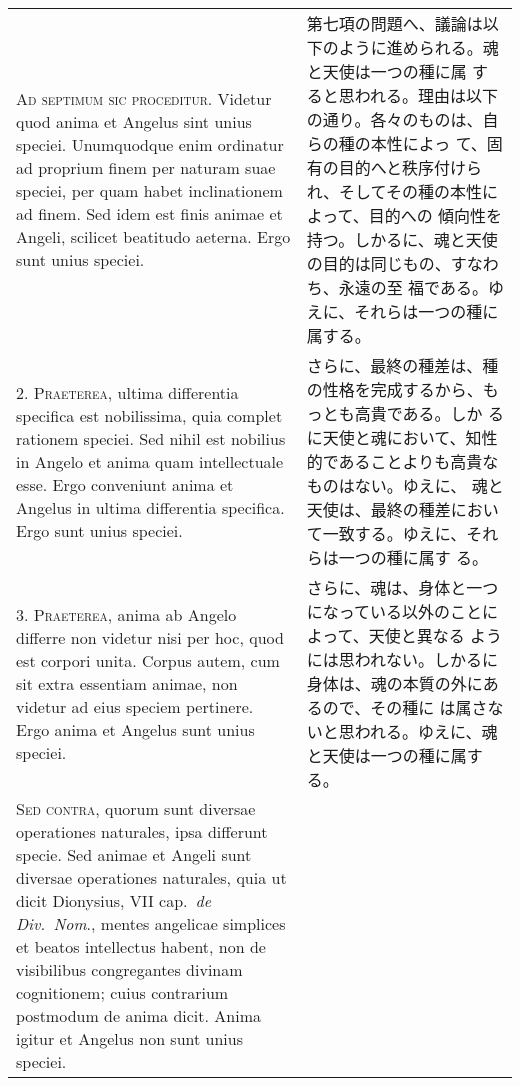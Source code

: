 \documentclass[paper=a4paper,fontsize=10pt,jafontsize=9pt,titlepage]{jlreq}
\begin{document}
\begin{longtable}{p{21em}p{21em}}

{\scshape Ad septimum sic proceditur}. Videtur quod anima et Angelus
 sint unius speciei. Unumquodque enim ordinatur ad proprium finem per
 naturam suae speciei, per quam habet inclinationem ad finem. Sed idem
 est finis animae et Angeli, scilicet beatitudo aeterna. Ergo sunt
 unius speciei.

&

 第七項の問題へ、議論は以下のように進められる。魂と天使は一つの種に属
 すると思われる。理由は以下の通り。各々のものは、自らの種の本性によっ
 て、固有の目的へと秩序付けられ、そしてその種の本性によって、目的への
 傾向性を持つ。しかるに、魂と天使の目的は同じもの、すなわち、永遠の至
 福である。ゆえに、それらは一つの種に属する。
 
\\



2. {\scshape Praeterea}, ultima differentia specifica est nobilissima,
quia complet rationem speciei. Sed nihil est nobilius in Angelo et
anima quam intellectuale esse. Ergo conveniunt anima et Angelus in
ultima differentia specifica. Ergo sunt unius speciei.

&

さらに、最終の種差は、種の性格を完成するから、もっとも高貴である。しか
るに天使と魂において、知性的であることよりも高貴なものはない。ゆえに、
魂と天使は、最終の種差において一致する。ゆえに、それらは一つの種に属す
る。
 
\\



3. {\scshape Praeterea}, anima ab Angelo differre non videtur nisi per
hoc, quod est corpori unita. Corpus autem, cum sit extra essentiam
animae, non videtur ad eius speciem pertinere. Ergo anima et Angelus
sunt unius speciei.

&

 さらに、魂は、身体と一つになっている以外のことによって、天使と異なる
 ようには思われない。しかるに身体は、魂の本質の外にあるので、その種に
 は属さないと思われる。ゆえに、魂と天使は一つの種に属する。
 
\\



{\scshape Sed contra}, quorum sunt diversae operationes naturales,
ipsa differunt specie. Sed animae et Angeli sunt diversae operationes
naturales, quia ut dicit Dionysius, VII cap.~{\itshape de Div.~Nom}.,
mentes angelicae simplices et beatos intellectus habent, non de
visibilibus congregantes divinam cognitionem; cuius contrarium
postmodum de anima dicit. Anima igitur et Angelus non sunt unius
speciei.


\end{longtable}
\end{document}
